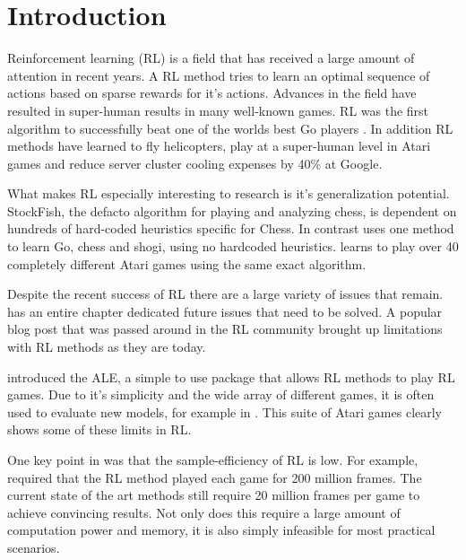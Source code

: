 
\chapter{Introduction}\label{ch:intro}

Reinforcement learning (RL) is a field that has received a large amount of attention in recent years. A RL method tries to learn an optimal sequence of actions based on sparse rewards for it's actions. Advances in the field have resulted in super-human results in many well-known games. RL was the first algorithm to successfully beat one of the worlds best Go players \citep{silver_2017}. In addition RL methods have learned to fly helicopters\citep{abbeel_2007}, play at a super-human level in Atari games \citep{mnih_2015} and reduce server cluster cooling expenses by 40\% at Google\citep{deepmind}.

What makes RL especially interesting to research is it's generalization potential.  StockFish, the defacto algorithm for playing and analyzing chess, is dependent on hundreds of hard-coded heuristics specific for Chess. In contrast \cite{silver_2017b} uses one method to learn Go, chess and shogi, using no hardcoded heuristics. \cite{mnih_2015} learns to play over 40 completely different Atari games using the same exact algorithm.

Despite the recent success of RL there are a large variety of issues that remain. \cite{sutton_barto_2018} has an entire chapter dedicated future issues that need to be solved. A popular blog post that was passed around in the RL community \citep{blog} brought up limitations with RL methods as they are today. 

\cite{bellemare_2013} introduced the ALE, a simple to use package that allows RL methods to play RL games.  Due to it's simplicity and the wide array of different games, it is often used to evaluate new models, for example in \cite{mnih_2015}. This suite of Atari games clearly shows some of these limits in RL. 

One key point in \cite{blog} was that the sample-efficiency of RL is low. For example, \cite{mnih_2015} required that the RL method played each game for 200 million frames. The current state of the art methods still require 20 million frames per game \citep{hessel_2017} to achieve convincing results. Not only does this require a large amount of computation power and memory, it is also simply infeasible for most practical scenarios.

